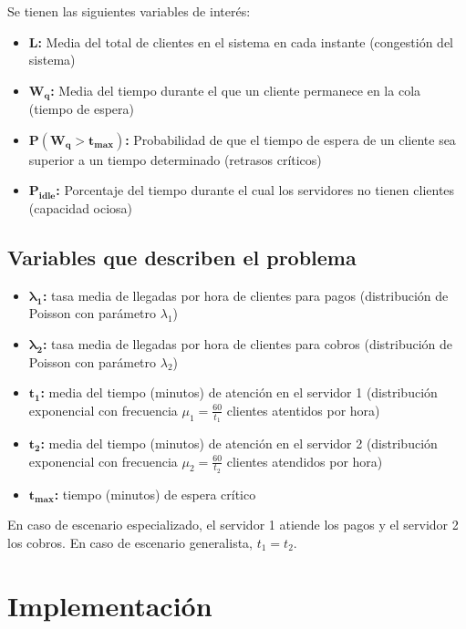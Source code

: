 \documentclass[letterpaper, 12pt]{report}
\begin{document}
Se tienen las siguientes variables de interés:
\begin{itemize}
    \item \textbf{L:} Media del total de clientes en el sistema en cada instante (congestión del sistema)
    \item \(\mathbf{W_q}\)\textbf{:} Media del tiempo durante el que un cliente permanece en la cola (tiempo de espera)
    \item \(\mathbf{P ( W_q > t_{max})}\)\textbf{:} Probabilidad de que el tiempo de espera de un cliente sea superior a un tiempo determinado (retrasos críticos)
    \item \(\mathbf{P_{idle}}\)\textbf{:} Porcentaje del tiempo durante el cual los servidores no tienen clientes (capacidad ociosa)  
\end{itemize}


\section{Variables que describen el problema}

\begin{itemize}
    \item \(\mathbf{\lambda_1}\)\textbf{:} tasa media de llegadas por hora de clientes para pagos (distribución de Poisson con parámetro $\lambda_1$)
    \item \(\mathbf{\lambda_2}\)\textbf{:} tasa  media de llegadas por hora de clientes para cobros (distribución de Poisson con parámetro $\lambda_2$)    
    \item \(\mathbf{t_1}\)\textbf{:} media del tiempo (minutos) de atención en el servidor 1 (distribución exponencial con frecuencia $\mu_1 = \frac{60}{t_1}$ clientes atentidos por hora)
    \item \(\mathbf{t_2}\)\textbf{:} media del tiempo (minutos) de atención en el servidor 2 (distribución exponencial con frecuencia $\mu_2 = \frac{60}{t_2}$ clientes atendidos por hora)
    \item \(\mathbf{t_{max}}\)\textbf{:} tiempo (minutos) de espera crítico 
\end{itemize}

En caso de escenario especializado, el servidor 1 atiende los pagos y el servidor 2 los cobros. En caso de escenario generalista, $t_1 = t_2$.



\chapter{Implementación}
\end{document}
